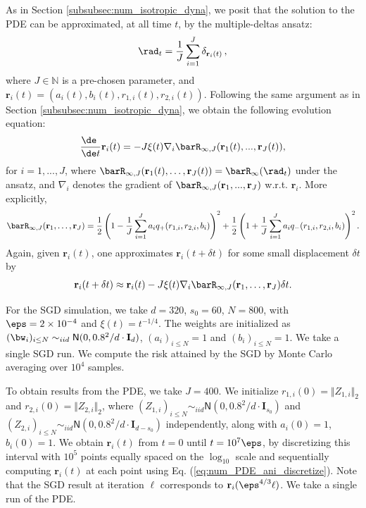 \documentclass[11pt]{article}
\begin{document}
 As in Section \ref{subsubsec:num_isotropic_dyna}, we posit that the solution to the PDE can be approximated, at all time $t$, by the multiple-deltas ansatz:
\begin{align}
\rad_t = \frac{1}{J}\sum_{i=1}^J\delta_{\mathbf{r}_i(t)}\, ,
\end{align}
where $J\in\mathbb{N}$ is a pre-chosen parameter, and $\mathbf{r}_i(t)=(a_i(t),b_i(t),r_{1,i}(t),r_{2,i}(t))$. Following the same argument as in Section \ref{subsubsec:num_isotropic_dyna}, we obtain the following evolution equation:
\begin{align}
\frac{\de\phantom{t}}{\de t}\mathbf{r}_i(t) = -J\xi(t)\nabla_i \barR_{\infty,J}(\mathbf{r}_1(t),...,\mathbf{r}_J(t)),
\end{align}
for $i=1,...,J$, where $\barR_{\infty,J}(\mathbf{r}_1(t),\dots,\mathbf{r}_J(t)) = \barR_\infty(\rad_t)$ under the ansatz, and $\nabla_i$ denotes the gradient of $\barR_{\infty,J}(\mathbf{r}_1,...,\mathbf{r}_J)$ w.r.t. $\mathbf{r}_i$. More explicitly,
\begin{align}
\barR_{\infty,J}(\mathbf{r}_1,\dots ,\mathbf{r}_J) = \frac{1}{2}\left(1-\frac{1}{J}\sum_{i=1}^Ja_iq_+(r_{1,i},r_{2,i},b_i)\right)^2+\frac{1}{2}\left(1+\frac{1}{J}\sum_{i=1}^J a_iq_-(r_{1,i},r_{2,i},b_i)\right)^2.
\end{align}
Again, given $\mathbf{r}_i(t)$,  one approximates $\mathbf{r}_i(t+\delta t)$ for some small displacement $\delta t$ by
\begin{align}
\mathbf{r}_i(t+\delta t) \approx \mathbf{r}_i(t) -J\xi(t)\nabla_i \barR_{\infty,J}(\mathbf{r}_1,\dots,\mathbf{r}_J)\delta t.\label{eq:num_PDE_ani_discretize}
\end{align}

 For the SGD simulation, we take $d=320$, $s_0=60$, $N=800$, with $\eps=2\times10^{-4}$ and $\xi(t) = t^{-1/4}$. The weights are initialized as $(\bw_{i})_{i\leq N}\sim_{iid}\mathsf{N}(0,0.8^2/d\cdot \mathbf{I}_d)$, $(a_i)_{i\leq N}=1$ and $(b_i)_{i\leq N}=1$. We take a single SGD run. We compute the risk attained by the SGD by Monte Carlo averaging over $10^4$ samples.

To obtain results from the PDE, we take $J=400$. We initialize $r_{1,i}(0)=\Vert Z_{1,i}\Vert_2$ and $r_{2,i}(0)=\Vert Z_{2,i}\Vert_2$, where $(Z_{1,i})_{i\leq N}\sim_{iid}\mathsf{N}(0,0.8^2/d\cdot \mathbf{I}_{s_0})$ and $(Z_{2,i})_{i\leq N}\sim_{iid}\mathsf{N}(0,0.8^2/d\cdot \mathbf{I}_{d-s_0})$ independently, along with $a_i(0) = 1$, $b_i(0) = 1$. We obtain $\mathbf{r}_i(t)$ from $t=0$ until $t=10^7\eps$, by discretizing this interval with $10^5$ points equally spaced on the $\log_{10}$ scale and sequentially computing $\mathbf{r}_i(t)$ at each point using Eq. (\ref{eq:num_PDE_ani_discretize}). Note that the SGD result at iteration $\ell$ corresponds to $\mathbf{r}_i(\eps^{4/3} \ell)$. We take a single run of the PDE.
\end{document}
